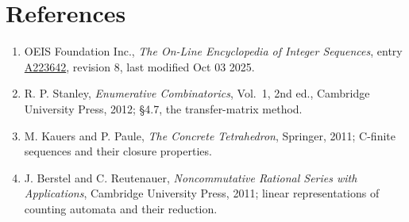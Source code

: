 \documentclass[11pt]{article}
\theoremstyle{definition}
\begin{document}
\section{References}

\begin{enumerate}

\item OEIS Foundation Inc., \emph{The On-Line Encyclopedia of Integer Sequences}, entry \href{https://oeis.org/A223642}{A223642}, revision 8, last modified Oct 03 2025.

\item R. P. Stanley, \emph{Enumerative Combinatorics}, Vol.~1, 2nd ed., Cambridge University Press, 2012; \S4.7, the transfer-matrix method.

\item M. Kauers and P. Paule, \emph{The Concrete Tetrahedron}, Springer, 2011; C-finite sequences and their closure properties.

\item J. Berstel and C. Reutenauer, \emph{Noncommutative Rational Series with Applications}, Cambridge University Press, 2011; linear representations of counting automata and their reduction.

\end{enumerate}
\end{document}
